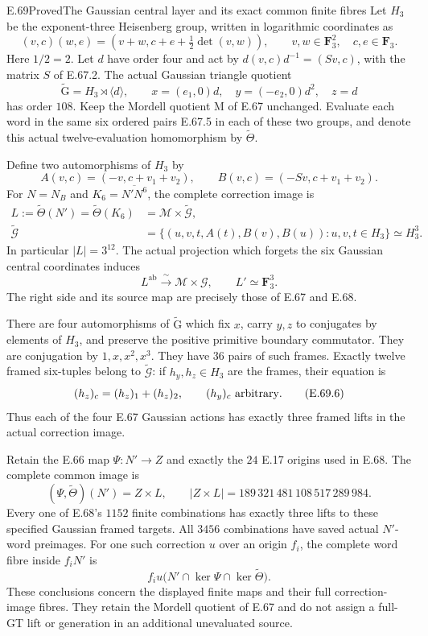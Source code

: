 \begin{statement}{E.69}{Proved}{The Gaussian central layer and its exact common finite fibres}
Let $H_3$ be the exponent-three Heisenberg group, written in
logarithmic coordinates as
\[
 (v,c)(w,e)=(v+w,c+e+\tfrac12\det(v,w)),
 \qquad v,w\in\mathbf F_3^2,\quad c,e\in\mathbf F_3.
 \tag{E.69.1}
\]
Here $1/2=2$. Let $d$ have order four and act by
$d(v,c)d^{-1}=(Sv,c)$, with the matrix $S$ of E.67.2.
The actual Gaussian triangle quotient
\[
 \widetilde{\mathrm G}=H_3\rtimes\langle d\rangle,
 \qquad
 x=(e_1,0)d,\quad y=(-e_2,0)d^2,\quad z=d
 \tag{E.69.2}
\]
has order $108$. Keep the Mordell quotient $\mathrm M$ of
E.67 unchanged. Evaluate each word in the same six ordered
pairs E.67.5 in each of these two groups, and denote this
actual twelve-evaluation homomorphism by $\widetilde\Theta$.

Define two automorphisms of $H_3$ by
\[
 A(v,c)=(-v,c+v_1+v_2),\qquad
 B(v,c)=(-Sv,c+v_1+v_2).
 \tag{E.69.3}
\]
For $N=N_B$ and $K_6=\overline{N'N^6}$, the complete
correction image is
\[
 \begin{split}
 L:=\widetilde\Theta(N')=\widetilde\Theta(K_6)
   &=\mathcal M\times\widetilde{\mathcal G},\\
 \widetilde{\mathcal G}
   &=\{(u,v,t,A(t),B(v),B(u)):u,v,t\in H_3\}
     \simeq H_3^3.
 \end{split}
 \tag{E.69.4}
\]
In particular $|L|=3^{12}$. The actual projection which
forgets the six Gaussian central coordinates induces
\[
       L^{\mathrm{ab}}\xrightarrow{\ \sim\ }
       \mathcal M\times\mathcal G,
       \qquad L'\simeq\mathbf F_3^3.
 \tag{E.69.5}
\]
The right side and its source map are precisely those of
E.67 and E.68.

There are four automorphisms of $\widetilde{\mathrm G}$
which fix $x$, carry $y,z$ to conjugates by elements of
$H_3$, and preserve the positive primitive boundary
commutator. They are conjugation by $1,x,x^2,x^3$.
They have $36$ pairs of such frames. Exactly twelve
framed six-tuples belong to $\widetilde{\mathcal G}$:
if $h_y,h_z\in H_3$ are the frames, their equation is
\[
          (h_z)_c=(h_z)_1+(h_z)_2,
          \qquad (h_y)_c\ \hbox{arbitrary}.
 \tag{E.69.6}
\]
Thus each of the four E.67 Gaussian actions has exactly
three framed lifts in the actual correction image.

Retain the E.66 map $\Psi:N'\to Z$ and exactly the
$24$ E.17 origins used in E.68. The complete common image is
\[
       (\Psi,\widetilde\Theta)(N')=Z\times L,
       \qquad |Z\times L|=189\,321\,481\,108\,517\,289\,984.
 \tag{E.69.7}
\]
Every one of E.68's $1152$ finite combinations has exactly
three lifts to these specified Gaussian framed targets.
All $3456$ combinations have saved actual $N'$-word
preimages. For one such correction $u$ over an origin
$f_i$, the complete word fibre inside $f_iN'$ is
\[
 f_i u\bigl(N'\cap\ker\Psi\cap\ker\widetilde\Theta\bigr).
 \tag{E.69.8}
\]
These conclusions concern the displayed finite maps and
their full correction-image fibres. They retain the
Mordell quotient of E.67 and do not assign a full-GT
lift or generation in an additional unevaluated source.
\end{statement}
